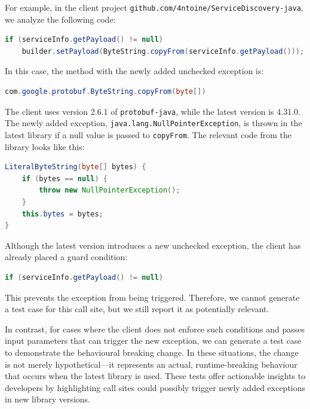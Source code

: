 For example, in the client project \texttt{github.com/4ntoine/ServiceDiscovery-java}, we analyze the following code:

\begin{lstlisting}[language=Java, basicstyle=\scriptsize\ttfamily, breaklines=true]
if (serviceInfo.getPayload() != null)
    builder.setPayload(ByteString.copyFrom(serviceInfo.getPayload()));
\end{lstlisting}

In this case, the method with the newly added unchecked exception is:

\begin{lstlisting}[language=Java, basicstyle=\scriptsize\ttfamily]
com.google.protobuf.ByteString.copyFrom(byte[])
\end{lstlisting}

The client uses version 2.6.1 of \texttt{protobuf-java}, while the latest version is 4.31.0. The newly added exception, \texttt{java.lang.NullPointerException}, is thrown in the latest library if a null value is passed to \texttt{copyFrom}. The relevant code from the library looks like this:

\begin{lstlisting}[language=Java, basicstyle=\scriptsize\ttfamily]
LiteralByteString(byte[] bytes) {
    if (bytes == null) {
        throw new NullPointerException();
    }
    this.bytes = bytes;
}
\end{lstlisting}

Although the latest version introduces a new unchecked exception, the client has already placed a guard condition:

\begin{lstlisting}[language=Java, basicstyle=\scriptsize\ttfamily]
if (serviceInfo.getPayload() != null)
\end{lstlisting}

This prevents the exception from being triggered. Therefore, we cannot generate a test case for this call site, but we still report it as potentially relevant.

In contrast, for cases where the client does not enforce such conditions and passes input parameters that can trigger the new exception, we can generate a test case to demonstrate the behavioural breaking change. In these situations, the change is not merely hypothetical—it represents an actual, runtime-breaking behaviour that occurs when the latest library is used. These tests offer actionable insights to developers by highlighting call sites could possibly trigger newly added exceptions in new library versions.


